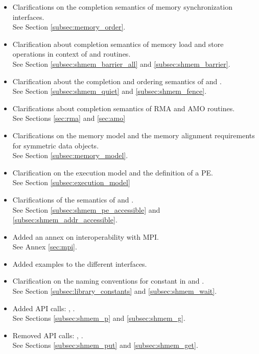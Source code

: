 \begin{itemize}
\item Clarifications on the completion semantics of memory synchronization 
interfaces.\\See Section \ref{subsec:memory_order}.
\item Clarification about completion semantics of memory load and store 
operations in context of  and  
routines.\\See Section \ref{subsec:shmem_barrier_all} and \ref{subsec:shmem_barrier}.
\item Clarification about the completion and ordering semantics of  and .
\\See Section \ref{subsec:shmem_quiet} and \ref{subsec:shmem_fence}.
\item Clarifications about completion semantics of \ac{RMA} and \ac{AMO} routines.
\\See Sections \ref{sec:rma} and \ref{sec:amo}
\item Clarifications on the memory model and the memory alignment requirements for symmetric data objects.
\\See Section \ref{subsec:memory_model}.
\item Clarification on the execution model and the definition of a \ac{PE}.
\\See Section \ref{subsec:execution_model}
\item Clarifications of the semantics of  and .
\\See Section \ref{subsec:shmem_pe_accessible} and \ref{subsec:shmem_addr_accessible}.
\item Added an annex on interoperability with \ac{MPI}.\\See Annex \ref{sec:mpi}.
\item Added examples to the different interfaces.
\item Clarification on the naming conventions for constant in \Clang{} and \Fortran{}.
\\See Section \ref{subsec:library_constants} and \ref{subsec:shmem_wait}.
\item Added \ac{API} calls: , .\\See Sections \ref{subsec:shmem_p} and \ref{subsec:shmem_g}. 
\item Removed \ac{API} calls: , .\\ See Sections \ref{subsec:shmem_put} and \ref{subsec:shmem_get}. 

\end{itemize}
